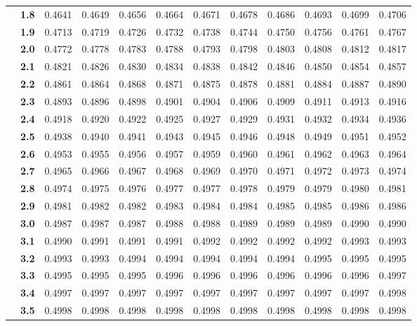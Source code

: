 \begin{tabular}{cc|cccccccccc}
    & \textbf{1.8} & 0.4641 & 0.4649 & 0.4656 & 0.4664 & 0.4671 & 0.4678 & 0.4686 & 0.4693 & 0.4699 & 0.4706 \\
    & \textbf{1.9} & 0.4713 & 0.4719 & 0.4726 & 0.4732 & 0.4738 & 0.4744 & 0.4750 & 0.4756 & 0.4761 & 0.4767 \\
    & \textbf{2.0} & 0.4772 & 0.4778 & 0.4783 & 0.4788 & 0.4793 & 0.4798 & 0.4803 & 0.4808 & 0.4812 & 0.4817 \\
    & \textbf{2.1} & 0.4821 & 0.4826 & 0.4830 & 0.4834 & 0.4838 & 0.4842 & 0.4846 & 0.4850 & 0.4854 & 0.4857 \\
    & \textbf{2.2} & 0.4861 & 0.4864 & 0.4868 & 0.4871 & 0.4875 & 0.4878 & 0.4881 & 0.4884 & 0.4887 & 0.4890 \\
    & \textbf{2.3} & 0.4893 & 0.4896 & 0.4898 & 0.4901 & 0.4904 & 0.4906 & 0.4909 & 0.4911 & 0.4913 & 0.4916 \\
    & \textbf{2.4} & 0.4918 & 0.4920 & 0.4922 & 0.4925 & 0.4927 & 0.4929 & 0.4931 & 0.4932 & 0.4934 & 0.4936 \\
    & \textbf{2.5} & 0.4938 & 0.4940 & 0.4941 & 0.4943 & 0.4945 & 0.4946 & 0.4948 & 0.4949 & 0.4951 & 0.4952 \\
    & \textbf{2.6} & 0.4953 & 0.4955 & 0.4956 & 0.4957 & 0.4959 & 0.4960 & 0.4961 & 0.4962 & 0.4963 & 0.4964 \\
    & \textbf{2.7} & 0.4965 & 0.4966 & 0.4967 & 0.4968 & 0.4969 & 0.4970 & 0.4971 & 0.4972 & 0.4973 & 0.4974 \\
    & \textbf{2.8} & 0.4974 & 0.4975 & 0.4976 & 0.4977 & 0.4977 & 0.4978 & 0.4979 & 0.4979 & 0.4980 & 0.4981 \\
    & \textbf{2.9} & 0.4981 & 0.4982 & 0.4982 & 0.4983 & 0.4984 & 0.4984 & 0.4985 & 0.4985 & 0.4986 & 0.4986 \\
    & \textbf{3.0} & 0.4987 & 0.4987 & 0.4987 & 0.4988 & 0.4988 & 0.4989 & 0.4989 & 0.4989 & 0.4990 & 0.4990 \\
    & \textbf{3.1} & 0.4990 & 0.4991 & 0.4991 & 0.4991 & 0.4992 & 0.4992 & 0.4992 & 0.4992 & 0.4993 & 0.4993 \\
    & \textbf{3.2} & 0.4993 & 0.4993 & 0.4994 & 0.4994 & 0.4994 & 0.4994 & 0.4994 & 0.4995 & 0.4995 & 0.4995 \\
    & \textbf{3.3} & 0.4995 & 0.4995 & 0.4995 & 0.4996 & 0.4996 & 0.4996 & 0.4996 & 0.4996 & 0.4996 & 0.4997 \\
    & \textbf{3.4} & 0.4997 & 0.4997 & 0.4997 & 0.4997 & 0.4997 & 0.4997 & 0.4997 & 0.4997 & 0.4997 & 0.4998 \\
    & \textbf{3.5} & 0.4998 & 0.4998 & 0.4998 & 0.4998 & 0.4998 & 0.4998 & 0.4998 & 0.4998 & 0.4998 & 0.4998 \\
    \bottomrule
\end{tabular}

%

